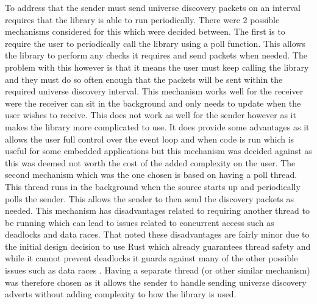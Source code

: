 \documentclass[11pt,a4paper]{article}
\begin{document}
To address that the sender must send universe discovery packets on an interval requires that the library is able to run periodically. There were 2 possible mechanisms considered for this which were decided between. The first is to require the user to periodically call the library using a poll function. This allows the library to perform any checks it requires and send packets when needed. The problem with this however is that it means the user must keep calling the library and they must do so often enough that the packets will be sent within the required universe discovery interval. This mechanism works well for the receiver were the receiver can sit in the background and only needs to update when the user wishes to receive. This does not work as well for the sender however as it makes the library more complicated to use. It does provide some advantages as it allows the user full control over the event loop and when code is run which is useful for some embedded applications but this mechanism was decided against as this was deemed not worth the cost of the added complexity on the user. The second mechanism which was the one chosen is based on having a poll thread. This thread runs in the background when the source starts up and periodically polls the sender. This allows the sender to then send the discovery packets as needed. This mechanism has disadvantages related to requiring another thread to be running which can lead to issues related to concurrent access such as deadlocks and data races. That noted these disadvantages are fairly minor due to the initial design decision to use Rust which already guarantees thread safety and while it cannot prevent deadlocks it guards against many of the other possible issues such as data races \cite{RUST_DATA_RACE}. Having a separate thread (or other similar mechanism) was therefore chosen as it allows the sender to handle sending universe discovery adverts without adding complexity to how the library is used. \\
\end{document}
